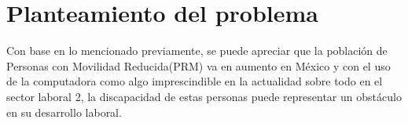 \section{Planteamiento del problema}
Con base en lo mencionado previamente, se puede apreciar que la población de
 Personas con Movilidad Reducida(PRM) va en aumento en México y con el uso de
 la computadora como algo imprescindible en la actualidad sobre todo en el
 sector laboral 2, la discapacidad de estas personas puede representar un
 obstáculo en su desarrollo laboral.